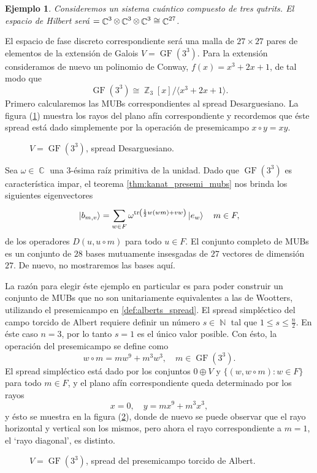 \documentclass[a4paper]{report}
\DeclareMathOperator{\C}{\mathbb{C}}
\DeclareMathOperator{\N}{\mathbb{N}}
\DeclareMathOperator{\Z}{\mathbb{Z}}
\let\H\relax
\DeclareMathOperator{\H}{\mathcal H}
\DeclareMathOperator{\tr}{tr}
\DeclareMathOperator{\GF}{GF}
\newtheorem{example}{Ejemplo}
\begin{document}
  \begin{example}
    Consideremos un sistema cuántico compuesto de tres
    qutrits. El espacio de Hilbert será $\H = \C^{3} \otimes
    \C^{3} \otimes \C^{3} \cong \C^{27}$.   
    \label{ex:qs-3-3}
  \end{example}
  El espacio de fase discreto correspondiente será una malla
  de $27 \times 27$ pares de elementos de la extensión de
  Galois $V = \GF(3^{3})$. Para la extensión consideramos de
  nuevo un polinomio de Conway, $f(x) = x^3 + 2x + 1$, de
  tal modo que
  \[
    \GF(3^{3}) \cong \Z_3[x] / \langle x^3+2x+1 \rangle.
  \] 
  Primero calcularemos las MUBs correspondientes al spread
  Desarguesiano. La figura
  (\ref{fig:3-3-desarguesian-plane}) muestra los rayos del
  plano afín correspondiente y recordemos que éste spread
  está dado simplemente por la operación de presemicampo $x
  \circ y = xy$.
  \begin{figure}[ht]
    \centering
    
    \caption{$V = \GF(3^{3})$, spread Desarguesiano.}
    \label{fig:3-3-desarguesian-plane}
  \end{figure}
  Sea $\omega \in \C$ una $3$-ésima raíz primitiva de la
  unidad. Dado que $\GF(3^3)$ es característica impar, el
  teorema \ref{thm:kanat_presemi_mubs} nos brinda los
  siguientes eigenvectores
  \begin{equation}
    \ket{b_{m,v}}
    = \sum_{w \in F}^{}
    \omega^{\tr\left(
        \frac{1}{2} w(wm) + vw
    \right) } \ket{e_w}
    \quad m \in F,
  \end{equation}
  de los operadores $D(u,u \circ m)$ para todo $u \in F$. El
  conjunto completo de MUBs es un conjunto de $28$ bases
  mutuamente insesgadas de $27$ vectores de dimensión $27$.
  De nuevo, no mostraremos las bases aquí.

  La razón para elegir éste ejemplo en particular es para
  poder construir un conjunto de MUBs que no son
  unitariamente equivalentes a las de Wootters, utilizando
  el presemicampo en \ref{def:alberts_spread}. El spread
  simpléctico del campo torcido de Albert requiere definir
  un número $s \in \N$ tal que $1 \leq s \leq \frac{n}{2}$.
  En éste caso $n = 3$, por lo tanto $s = 1$ es el único
  valor posible. Con ésto, la operación del presemicampo se
  define como
  \[
    w \circ m
    = m w^{9} + m^{3}w^{3},
    \quad m \in \GF(3^{3}).
  \] 
  El spread simpléctico está dado por los conjuntos $0
  \oplus V$ y $\{(w,w\circ m) : w \in F\}$ para todo $m \in
  F$, y el plano afín correspondiente queda determinado por
  los rayos
  \[
    x = 0,
    \quad
    y = mx^{9} + m^3 x^3,
  \] 
  y ésto se muestra en la figura
  (\ref{fig:3-3-albert-plane}), donde de nuevo se puede
  observar que el rayo horizontal y vertical son los mismos,
  pero ahora el rayo correspondiente a $m = 1$, el `rayo
  diagonal', es distinto.
  \begin{figure}[ht]
    \centering
    \scalebox{1}{
      
    }
    \caption{$V = \GF(3^{3})$, spread del presemicampo
    torcido de Albert.}
    \label{fig:3-3-albert-plane}
  \end{figure}
\end{document}
